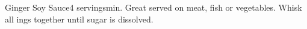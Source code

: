 \begin{recipe}{Ginger Soy Sauce}{4 servings}{\unit[5]{min.}}
\freeform Great served on meat, fish or vegetables.
\freeform Whisk all ings together until sugar is dissolved.
\end{recipe}
